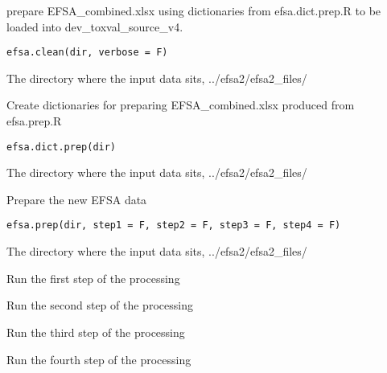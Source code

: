 \documentclass[letterpaper]{book}
\begin{document}
%
\begin{Description}\relax
prepare EFSA\_combined.xlsx using dictionaries from efsa.dict.prep.R to be 
loaded into dev\_toxval\_source\_v4.
\end{Description}
%
\begin{Usage}
\begin{verbatim}
efsa.clean(dir, verbose = F)
\end{verbatim}
\end{Usage}
%
\begin{Arguments}
\begin{ldescription}
\item[\code{dir}] The directory where the input data sits, ../efsa2/efsa2\_files/
\end{ldescription}
\end{Arguments}
%
\begin{Description}\relax
Create dictionaries for preparing EFSA\_combined.xlsx produced from efsa.prep.R
\end{Description}
%
\begin{Usage}
\begin{verbatim}
efsa.dict.prep(dir)
\end{verbatim}
\end{Usage}
%
\begin{Arguments}
\begin{ldescription}
\item[\code{dir}] The directory where the input data sits, ../efsa2/efsa2\_files/
\end{ldescription}
\end{Arguments}
%
\begin{Description}\relax
Prepare the new EFSA data
\end{Description}
%
\begin{Usage}
\begin{verbatim}
efsa.prep(dir, step1 = F, step2 = F, step3 = F, step4 = F)
\end{verbatim}
\end{Usage}
%
\begin{Arguments}
\begin{ldescription}
\item[\code{dir}] The directory where the input data sits, ../efsa2/efsa2\_files/

\item[\code{step1}] Run the first step of the processing

\item[\code{step2}] Run the second step of the processing

\item[\code{step3}] Run the third step of the processing

\item[\code{step4}] Run the fourth step of the processing
\end{ldescription}
\end{Arguments}
\end{document}

